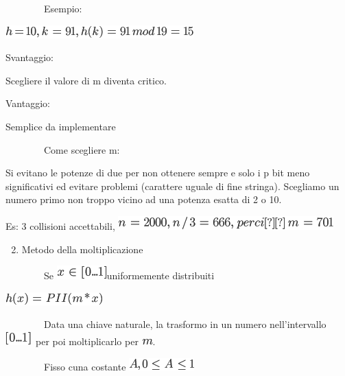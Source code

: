 \documentclass{article}
\providecommand{\tightlist}{%
  \setlength{\itemsep}{0pt}\setlength{\parskip}{0pt}}
\begin{document}
{~~~~~~~~Esempio: }

\includegraphics{images/image256.png}

{}

{Svantaggio: }

{Scegliere il valore di m diventa critico. }

{}

{Vantaggio:}

{Semplice da implementare}

{}

{~~~~~~~~Come scegliere m:}

{Si evitano le potenze di due per non ottenere sempre e solo i p bit
meno significativi ed evitare problemi (carattere uguale di fine
stringa). Scegliamo un numero primo non troppo vicino ad una potenza
esatta di 2 o 10.}

{Es: 3 collisioni accettabili, }\includegraphics{images/image257.png}

{}

{}

\begin{enumerate}
\setcounter{enumi}{1}
\tightlist
\item
  {Metodo della moltiplicazione}
\end{enumerate}

{}

{~~~~~~~~Se }\includegraphics{images/image258.png}{uniformemente
distribuiti}

\includegraphics{images/image259.png}

{}

{~~~~~~~~Data una chiave naturale, la trasformo in un numero
nell'intervallo }\includegraphics{images/image260.png}{~per poi
moltiplicarlo per }\includegraphics{images/image235.png}{.}

{~~~~~~~~Fisso cuna costante }\includegraphics{images/image261.png}
\end{document}
